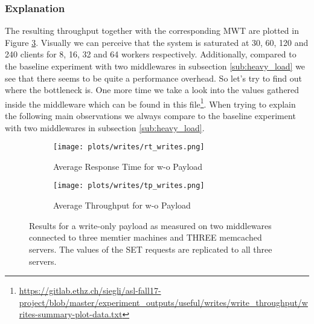\documentclass[11pt,a4paper]{article}
\begin{document}
\subsubsection{Explanation}
The resulting throughput together with the corresponding MWT are plotted in Figure \ref{plt:writes}. Visually we can perceive that the system is saturated at 30, 60, 120 and 240 clients for 8, 16, 32 and 64 workers respectively. Additionally, compared to the baseline experiment with two middlewares in subsection \ref{sub:heavy_load} we see that there seems to be quite a performance overhead. So let's try to find out where the bottleneck is. One more time we take a look into the values gathered inside the middleware which can be found in this file\footnote{\url{https://gitlab.ethz.ch/siegli/asl-fall17-project/blob/master/experiment_outputs/useful/writes/write_throughput/writes-summary-plot-data.txt}}. When trying to explain the following main observations we always compare to the baseline experiment with two middlewares in subsection \ref{sub:heavy_load}. 

\begin{figure}[H]
\centering

\begin{subfigure}{.5\textwidth}
    \centering
    \texttt{[image: plots/writes/rt\_writes.png]}
    \caption{Average Response Time for w-o Payload }
    \label{plt:write:rt}
\end{subfigure}%
\begin{subfigure}{.5\textwidth}
    \centering
    \texttt{[image: plots/writes/tp\_writes.png]}
    \caption{Average Throughput for w-o Payload}
    \label{plt:write:tp}

\end{subfigure}
\caption{Results for a write-only payload as measured on two middlewares connected to three memtier machines and THREE memcached servers. The values of the SET requests are replicated to all three servers.}
\label{plt:writes}
\end{figure}
\end{document}
